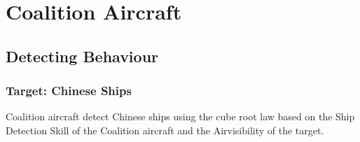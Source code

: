 \documentclass{article}
\begin{document}
\newpage

\section{Coalition Aircraft}

\subsection{Detecting Behaviour}
    
    \subsubsection{Target: Chinese Ships}
    Coalition aircraft detect Chinese ships using the cube root law based on the Ship Detection Skill of the Coalition aircraft and the Airvisibility of the target.
\end{document}
